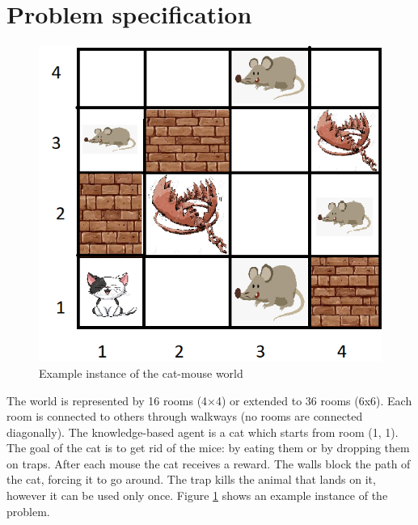 \section{Problem specification}

\begin{figure}[ht]
    \centering
    \includegraphics[width=.5\linewidth]{fig/A3/cat_06.png}
    \caption{Example instance of the cat-mouse world}
    \label{fig:overview}
\end{figure}


The world is represented by 16 rooms (4×4) or extended to 36 rooms (6x6). Each room is connected to others through walkways (no rooms are connected diagonally). The knowledge-based agent is a cat which starts from room (1, 1). The goal of the cat is to get rid of the mice: by eating them or by dropping them on traps. After each mouse the cat receives a reward. The walls block the path of the cat, forcing it to go around. The trap kills the animal that lands on it, however it can be used only once. Figure \ref{fig:overview} shows an example instance of the problem.
